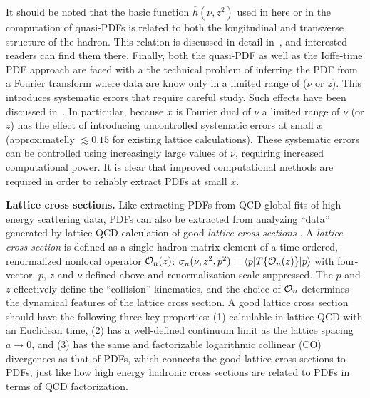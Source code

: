 It should be noted that the basic function $\overline h(\nu,z^2)$ used in here or in the computation of quasi-PDFs is related to both the longitudinal and transverse structure of the hadron. This relation is discussed in detail in~\cite{Musch:2010ka,Radyushkin:2017cyf,Broniowski:2017gfp}, and interested readers can find them there.
Finally, both the quasi-PDF as well as the Ioffe-time PDF approach are faced with a the technical problem of inferring the PDF from a Fourier transform where data are know only in  a limited range of ($\nu$ or $z$). This introduces systematic errors that require careful study. Such effects have been discussed in~\cite{Chen:2017lnm,Lin:2017ani,Broniowski:2017gfp}. In particular, because $x$ is Fourier dual of $\nu$ a limited range of $\nu$ (or $z$) has the effect of introducing uncontrolled systematic errors at small $x$ (approximatelly $\lesssim 0.15 $ for existing lattice calculations). These systematic errors  can be controlled using increasingly large values of $\nu$, requiring increased computational power.  It is clear that improved computational methods are required in order to reliably extract PDFs at small $x$.

{\bf Lattice cross sections.}  Like extracting PDFs from QCD global fits of high energy scattering data, PDFs can also be extracted from analyzing ``data'' generated by lattice-QCD calculation of good {\it lattice cross sections} \cite{Ma:2014jla,Ma:2014jga}. A {\it lattice cross section} is defined as a single-hadron matrix element of a time-ordered, renormalized nonlocal operator ${\cal O}_n(z)$: ${\sigma}_{n}(\nu,z^2,p^2)=\langle p| {T}\{{\cal O}_n({z})\}|p\rangle$ with four-vector, $p$, $z$ and $\nu$ defined above and renormalization scale suppressed. The $p$ and $z$ effectively define the ``collision'' kinematics, and the choice of ${\cal O}_n$ determines the dynamical features of the lattice cross section. A good lattice cross section should have the following three key properties: (1) calculable in lattice-QCD with an Euclidean time, (2) has a well-defined continuum limit as the lattice spacing $a\to 0$, and (3) has the same and factorizable logarithmic collinear (CO) divergences as that of PDFs, which connects the good lattice cross sections to PDFs, just like how high energy hadronic cross sections are related to PDFs in terms of QCD factorization.  

